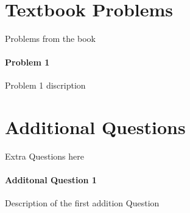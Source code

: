 \documentclass[12pt]{article}
\title{\class{} \assign{} \hwNum{}}
\author{\name{}}
\date{\displaydate{date}}
\begin{document}
\maketitle
\newpage

\section{Textbook Problems}
Problems from the book

\paragraph{Problem 1}
Problem 1 discription

\section{Additional Questions}
Extra Questions here

\paragraph{Additonal Question 1}
Description of the first addition Question
\end{document}
